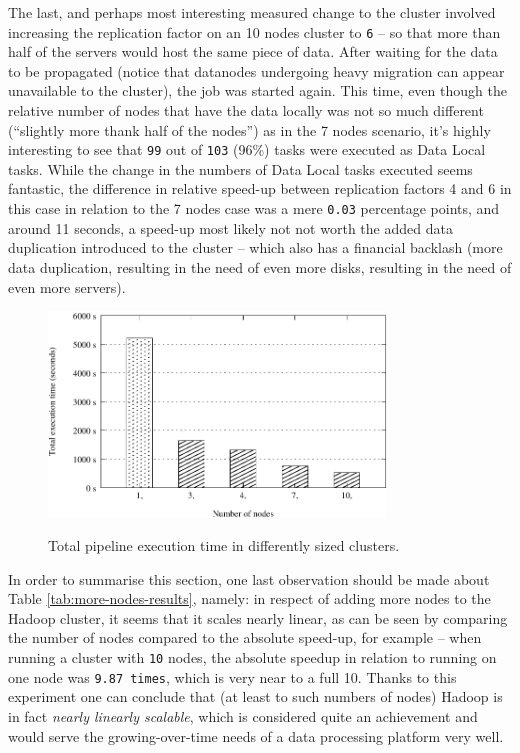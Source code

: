 The last, and perhaps most interesting measured change to the cluster involved increasing the replication factor on an 10 nodes cluster to \verb|6| -- so that more than half of the servers would host the same piece of data. After waiting for the data to be propagated (notice that datanodes undergoing heavy migration can appear unavailable to the cluster), the job was started again. This time, even though the relative number of nodes that have the data locally was not so much different (``slightly more thank half of the nodes'') as in the 7 nodes scenario, it's highly interesting to see that \verb|99| out of \verb|103| (96\%) tasks were executed as Data Local tasks. While the change in the numbers of Data Local tasks executed seems fantastic, the difference in relative speed-up between replication factors 4 and 6 in this case in relation to the 7 nodes case was a mere \verb|0.03| percentage points, and around 11 seconds, a speed-up most likely not not worth the added data duplication introduced to the cluster -- which also has a financial backlash (more data duplication, resulting in the need of even more disks, resulting in the need of even more servers).

\begin{figure}[ch!]
  \centering
  \includegraphics[width=0.80\textwidth]{img/hadoop/nodes-perf.pdf}
  \label{fig:nodes-pers-graph}
  \caption{Total pipeline execution time in differently sized clusters.}
\end{figure}

In order to summarise this section, one last observation should be made about Table \ref{tab:more-nodes-results}, namely: in respect of adding more nodes to the Hadoop cluster, it seems that it scales nearly linear, as can be seen by comparing the number of nodes compared to the absolute speed-up, for example -- when running a cluster with \verb|10| nodes, the absolute speedup in relation to running on one node was \verb|9.87 times|, which is very near to a full 10. Thanks to this experiment one can conclude that (at least to such numbers of nodes) Hadoop is in fact \textit{nearly linearly scalable}, which is considered quite an achievement and would serve the growing-over-time needs of a data processing platform very well.


